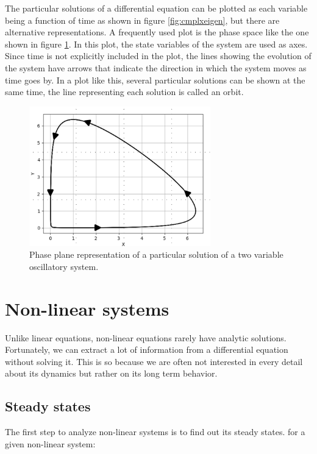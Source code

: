 \documentclass{tufte-book} %
\begin{document}
The particular solutions of a differential equation can be plotted as each variable being a function of time as shown in figure \ref{fig:cmplxeigen}, but there are alternative representations. A frequently used plot is the phase space like the one shown in figure \ref{fig:phase_plane}. In this plot, the state variables of the system are used as axes. Since time is not explicitly included in the plot, the lines showing the evolution of the system have arrows that indicate the direction in which the system moves as time goes by. In a plot like this, several particular solutions can be shown at the same time, the line representing each solution is called an orbit. 
\begin{figure}
	\begin{center}
		\includegraphics[width=0.7\textwidth]{phase_plane}
	\end{center}
	\caption{Phase plane representation of a particular solution of a two variable oscillatory system.}
	\label{fig:phase_plane}
\end{figure}

\section{Non-linear systems}

Unlike linear equations, non-linear equations rarely have analytic solutions. Fortunately, we can extract a lot of information from a differential equation without solving it. This is so because we are often not interested in every detail about its dynamics but rather on its long term behavior.

\subsection{Steady states}

The first step to analyze non-linear systems is to find out its steady states. for a given non-linear system:
\end{document}
